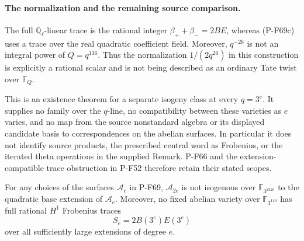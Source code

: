\paragraph{The normalization and the remaining source comparison.}
The full $\mathbb Q_\ell$-linear trace is the rational integer
$\beta_++\beta_-=2BE$, whereas (P-F69c) uses a trace over
the real quadratic coefficient field.  Moreover,
$q^{-26}$ is not an integral power of $Q=q^{116}$.
Thus the normalization $1/(2q^{26})$ in this construction
is explicitly a rational scalar and is not being described
as an ordinary Tate twist over $\mathbb F_Q$.

This is an existence theorem for a separate isogeny class
at every $q=3^e$.  It supplies no family over the $q$-line,
no compatibility between these varieties as $e$ varies,
and no map from the source nonstandard algebra or its
displayed candidate basis to correspondences on the
abelian surfaces.  In particular it does not identify
source products, the prescribed central word as Frobenius,
or the iterated theta operations in the supplied Remark.
P-F66 and the extension-compatible trace obstruction in
P-F52 therefore retain their stated scopes.

\begin{corollary}
For any choices of the surfaces $\mathcal A_e$ in P-F69,
$\mathcal A_{2e}$ is not isogenous over
$\mathbb F_{3^{232e}}$ to the quadratic base extension of
$\mathcal A_e$.  Moreover, no fixed abelian variety over
$\mathbb F_{3^{116}}$ has full rational $H^1$ Frobenius
traces
\[
                     S_e=2B(3^e)E(3^e)                         \tag{P-F69h}
\]
over all sufficiently large extensions of degree $e$.
\end{corollary}

